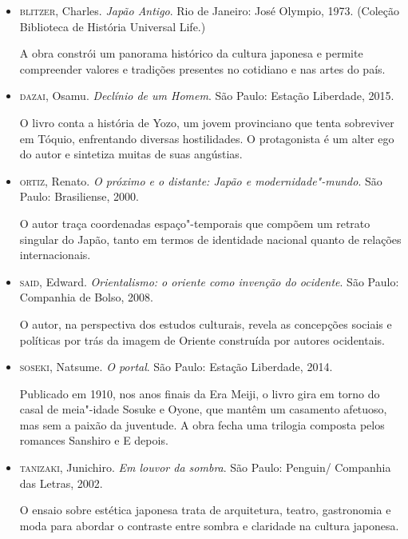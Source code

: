 \documentclass[12pt]{extarticle}
\begin{document}
\begin{itemize} 
  \item\textsc{blitzer}, Charles. \textit{Japão Antigo}. Rio de
      Janeiro: José Olympio, 1973. (Coleção Biblioteca de História Universal
      Life.)

  A obra constrói um panorama histórico da cultura japonesa e permite
    compreender valores e tradições presentes no cotidiano e nas artes do país.

\item\textsc{dazai}, Osamu. \textit{Declínio de um Homem}. São
      Paulo: Estação Liberdade, 2015.

O livro conta a história de Yozo, um jovem provinciano que tenta sobreviver em
    Tóquio, enfrentando diversas hostilidades. O protagonista é um alter ego do
    autor e sintetiza muitas de suas angústias.


\item\textsc{ortiz}, Renato. \textit{O próximo e o distante: Japão e
  modernidade"-mundo}. São Paulo: Brasiliense, 2000.

  O autor traça coordenadas espaço"-temporais que compõem um retrato singular
    do Japão, tanto em termos de identidade nacional quanto de relações
    internacionais.

\item\textsc{said}, Edward. \textit{Orientalismo: o oriente como invenção do
  ocidente}. São Paulo: Companhia de Bolso, 2008.

  O autor, na perspectiva dos estudos culturais, revela as concepções sociais e
    políticas por trás da imagem de Oriente construída por autores ocidentais.

\item\textsc{soseki}, Natsume. \textit{O portal}. São Paulo: Estação Liberdade,
  2014.

Publicado em 1910, nos anos finais da Era Meiji, o livro gira em torno do casal
    de meia"-idade Sosuke e Oyone, que mantêm um casamento afetuoso, mas sem a
    paixão da juventude. A obra fecha uma trilogia composta pelos romances
    Sanshiro e E depois.

\item\textsc{tanizaki}, Junichiro. \textit{Em louvor da sombra}. São Paulo:
  Penguin/ Companhia das Letras, 2002.

  O ensaio sobre estética japonesa trata de arquitetura, teatro, gastronomia e
    moda para abordar o contraste entre sombra e claridade na cultura japonesa.


\end{itemize}
\end{document}
